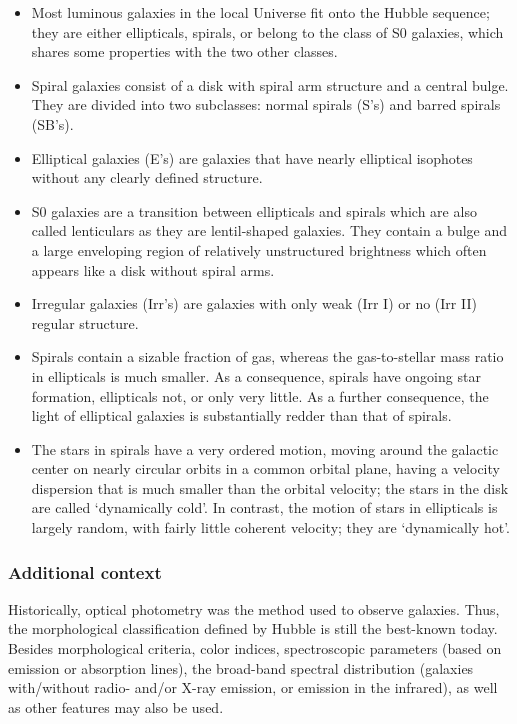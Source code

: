 \documentclass[a4paper,10pt]{article}
\begin{document}
\begin{itemize}
    \item Most luminous galaxies in the local Universe fit onto the Hubble sequence; they are either ellipticals, spirals, or belong to the class of S0 galaxies, which shares some properties with the two other classes.
    \item Spiral galaxies consist of a disk with spiral arm structure and a central bulge. They are divided into two subclasses: normal spirals (S's) and barred spirals (SB's).
    \item Elliptical galaxies (E's) are galaxies that have nearly elliptical isophotes without any clearly defined structure.
    \item S0 galaxies are a transition between ellipticals and spirals which are also called lenticulars as they are lentil-shaped galaxies. They contain a bulge and a large enveloping region of relatively unstructured brightness which often appears like a disk without spiral arms.
    \item Irregular galaxies (Irr's) are galaxies with only weak (Irr I) or no (Irr II) regular structure.
    \item Spirals contain a sizable fraction of gas, whereas the gas-to-stellar mass ratio in ellipticals is much smaller. As a consequence, spirals have ongoing star formation, ellipticals not, or only very little. As a further consequence, the light of elliptical galaxies is substantially redder than that of spirals.
    \item The stars in spirals have a very ordered motion, moving around the galactic center on nearly circular orbits in a common orbital plane, having a velocity dispersion that is much smaller than the orbital velocity; the stars in the disk are called `dynamically cold'. In contrast, the motion of stars in ellipticals is largely random, with fairly little coherent velocity; they are `dynamically hot'.
\end{itemize}

\subsubsection{Additional context}

Historically, optical photometry was the method used to observe galaxies. Thus, the morphological classification defined by Hubble is still the best-known today. Besides morphological criteria, color indices, spectroscopic parameters (based on emission or absorption lines), the broad-band spectral distribution (galaxies with/without radio- and/or X-ray emission, or emission in the infrared), as well as other features may also be used.
\end{document}
